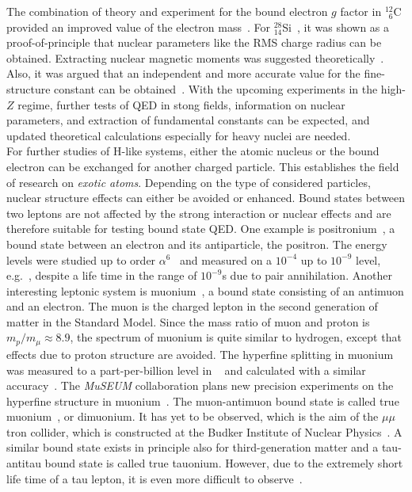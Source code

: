 The combination of theory and experiment for the bound electron $g$ factor in $^{12}_{\phantom{0}6}$C provided an improved value of the electron mass~\cite{Sturm2014,Zatorski2017}. For $^{28}_{14}$Si~\cite{Sturm2011}, it was shown as a proof-of-principle that nuclear parameters like the RMS charge radius can be obtained. Extracting nuclear magnetic moments was suggested theoretically~\cite{Yerokhin2011,Werth2001}. Also, it was argued that an independent and more accurate value for the fine-structure constant can be obtained~\cite{Shabaev2006,yerokhin2016}. With the upcoming experiments in the high-$Z$ regime, further tests of QED in stong fields, information on nuclear parameters, and extraction of fundamental constants can be expected, and updated theoretical calculations especially for heavy nuclei are needed.\\[11pt]
For further studies of H-like systems, either the atomic nucleus or the bound electron can be exchanged for another charged particle. This establishes the field of research on \textit{exotic atoms}. Depending on the type of considered particles, nuclear structure effects can either be avoided or enhanced. Bound states between two leptons are not affected by the strong interaction or nuclear effects and are therefore suitable for testing bound state QED. 
One example is positronium~\cite{karshenboim2004}, a bound state between an electron and its antiparticle, the positron. The energy levels were studied up to order $\alpha^6$~\cite{pineda1998,pachucki1998,czarnecki1999,zatorski2008} and measured on a $10^{-4}$ up to $10^{-9}$ level, e.g.~\cite{mills1975,ritter1984,danzmann1989,hagena1993,fee1993}, despite a life time in the range of $10^{-9}$s due to pair annihilation. 
Another interesting leptonic system is muonium~\cite{jungmann2004}, a bound state consisting of an antimuon and an electron. The muon is the charged lepton in the second generation of matter in the Standard Model. Since the mass ratio of muon and proton is $m_p/m_\mu \approx 8.9$, the spectrum of muonium is quite similar to hydrogen, except that effects due to proton structure are avoided. The hyperfine splitting in muonium was measured to a part-per-billion level in ~\cite{casperson1975,liu1999} and calculated with a similar accuracy~\cite{pachucki1996,Karshenboim1996,sapirstein1997,nio1997,eides1998}. The \textit{MuSEUM} collaboration plans new precision experiments on the hyperfine structure in muonium~\cite{museum}. 
The muon-antimuon bound state is called true muonium~\cite{brodsky2009}, or dimuonium. It has yet to be observed, which is the aim of the $\mu\mu$tron collider, which is constructed at the Budker Institute of Nuclear Physics~\cite{bogomyagkov2017}. 
A similar bound state exists in principle also for third-generation matter and a tau-antitau bound state is called true tauonium. However, due to the extremely short life time of a tau lepton, it is even more difficult to observe~\cite{brodsky2009}.


